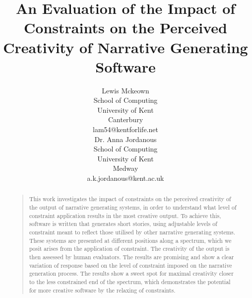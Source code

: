 \documentclass[letterpaper]{article}
\title{An Evaluation of the Impact of Constraints on the Perceived Creativity of Narrative Generating Software}
\author{Lewis Mckeown\\
School of Computing\\
University of Kent\\
Canterbury\\
lam54@kentforlife.net\\ 
\And Dr. Anna Jordanous\\
School of Computing\\
University of Kent\\
Medway\\
a.k.jordanous@kent.ac.uk\\
}
\begin{document}
 
\maketitle

\begin{abstract}
\begin{quote}
This work investigates the impact of constraints on the perceived creativity of the output of narrative generating systems, in order to understand what level of constraint application results in the most creative output. To achieve this, software is written that generates short stories, using adjustable levels of constraint meant to reflect those utilised by other narrative generating systems. These systems are presented at different positions along a spectrum, which we posit arises from the application of constraint. The creativity of the output is then assessed by human evaluators. The results are promising and show a clear variation of response based on the level of constraint imposed on the narrative generation process. The results show a sweet spot for maximal creativity closer to the less constrained end of the spectrum, which demonstrates the potential for more creative software by the relaxing of constraints. \end{quote}
\end{abstract}

\end{document}
